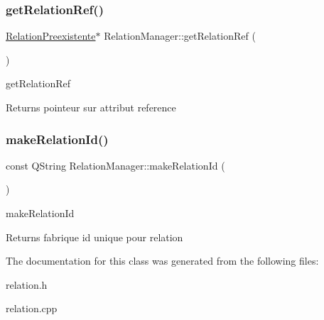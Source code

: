\subsubsection{\texorpdfstring{get\+Relation\+Ref()}{getRelationRef()}}
{\footnotesize\ttfamily \hyperlink{class_relation_preexistente}{Relation\+Preexistente}$\ast$ Relation\+Manager\+::get\+Relation\+Ref (\begin{DoxyParamCaption}{ }\end{DoxyParamCaption})\hspace{0.3cm}{\ttfamily [inline]}}



get\+Relation\+Ref 

\begin{DoxyReturn}{Returns}
pointeur sur attribut reference 
\end{DoxyReturn}
\mbox{\label{class_relation_manager_a471597e36dfca1a02f44b2a9f9d78905}} 
\subsubsection{\texorpdfstring{make\+Relation\+Id()}{makeRelationId()}}
{\footnotesize\ttfamily const Q\+String Relation\+Manager\+::make\+Relation\+Id (\begin{DoxyParamCaption}{ }\end{DoxyParamCaption})}



make\+Relation\+Id 

\begin{DoxyReturn}{Returns}
fabrique id unique pour relation 
\end{DoxyReturn}


The documentation for this class was generated from the following files\+:\begin{DoxyCompactItemize}
\item 
relation.\+h\item 
relation.\+cpp\end{DoxyCompactItemize}
